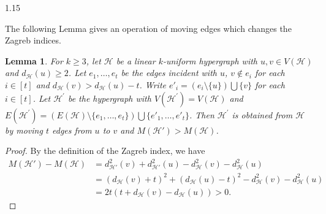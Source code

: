 \documentclass[preprint,12pt]{elsarticle1}
\newtheorem{lem}[thm]{Lemma}
\numberwithin{equation}{section}
\begin{document}
\begin{spacing}{1.15}






The following Lemma gives an operation of moving edges which changes the Zagreb indices.


\begin{lem}\label{sp277}
For $k\geq 3$, let $\mathcal{H}$ be a linear $k$-uniform hypergraph with $u,v\in V(\mathcal{H})$ and $d_{\mathcal{H}}(u)\geq 2$. Let $e_{1},\ldots,e_{t}$ be the edges incident with $u$, $v\notin e_{i}$ for each $i\in[t]$  and $d_{\mathcal{H}}(v)>d_{\mathcal{H}}(u)-t$.  Write $e'_{i}=(e_{i}\setminus \{u\})\bigcup\{v\}$ for each $i\in[t]$. Let $\mathcal{H}^{'}$ be the hypergraph with $V(\mathcal{H}^{'})=V(\mathcal{H})$ and $E(\mathcal{H}^{'})=(E(\mathcal{H})\setminus\{e_{1},\ldots,e_{t}\})\bigcup\{e'_{1},\ldots,e'_{t}\}$.
Then $\mathcal{H}^{'}$ is obtained from $\mathcal{H}$ by moving $t$ edges from $u$ to $v$ and $M(\mathcal{H}')>M(\mathcal{H})$.
\end{lem}
\begin{proof}
By the definition of the Zagreb index, we have
\begin{align*}
M(\mathcal{H}')-M(\mathcal{H})&=d^{2}_{\mathcal{H}'}(v)+d^{2}_{\mathcal{H}'}(u)-d^{2}_{\mathcal{H}}(v)-d^{2}_{\mathcal{H}}(u)\\
&=(d_{\mathcal{H}}(v)+t)^{2}+(d_{\mathcal{H}}(u)-t)^{2}-d_{\mathcal{H}}^{2}(v)-d_{\mathcal{H}}^{2}(u)\\
&=2t(t+d_{\mathcal{H}}(v)-d_{\mathcal{H}}(u))>0.
\end{align*}
\end{proof}




\end{spacing}
\end{document}
